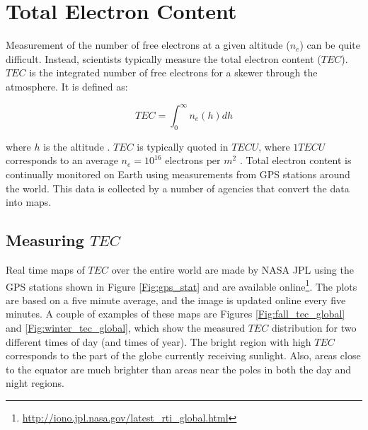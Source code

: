 \section{Total Electron Content}
Measurement of the number of free electrons at a given altitude ($n_e$) can be quite difficult. Instead, scientists typically measure the total electron content ($TEC$). $TEC$ is the integrated number of free electrons for a skewer through the atmosphere. It is defined as:

\begin{equation}
TEC = \int_0^\infty n_e (h) dh 
\end{equation}

where $h$ is the altitude \cite{thompson_2001}. $TEC$ is typically quoted in $TECU$, where $1 TECU$ corresponds to an average $n_e = 10^{16}$ electrons per $m^2$ \cite{vedantham_2014}. Total electron content is continually monitored on Earth using measurements from GPS stations around the world. This data is collected by a number of agencies that convert the data into maps. 

\subsection{Measuring $TEC$}
Real time maps of $TEC$ over the entire world are made by NASA JPL using the GPS stations shown in Figure \ref{Fig:gps_stat} and are available online\footnote{\url{http://iono.jpl.nasa.gov/latest_rti_global.html}}. The plots are based on a five minute average, and the image is updated online every five minutes. A couple of examples of these maps are Figures \ref{Fig:fall_tec_global} and \ref{Fig:winter_tec_global}, which show the measured $TEC$ distribution for two different times of day (and times of year). The bright region with high $TEC$ corresponds to the part of the globe currently receiving sunlight. Also, areas close to the equator are much brighter than areas near the poles in both the day and night regions.


